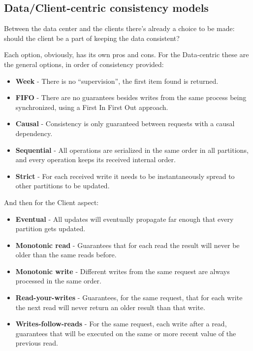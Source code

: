 \documentclass[14pt,oneside]{extreport}
\newcommand*\fpar{\hspace{1ex}}
\begin{document}
    \subsection{Data/Client-centric consistency models}
    \fpar Between the data center and the clients there's already a choice to be made: should the client be a part of keeping the data consistent?
    \par Each option, obviously, has its own pros and cons. For the Data-centric these are the general options, in order of consistency provided:
    \begin{itemize}[noitemsep]
      \item \textbf{Week} - There is no “supervision”, the first item found is returned.
      \item \textbf{FIFO} - There are no guarantees besides writes from the same process being synchronized, using a First In First Out approach.
      \item \textbf{Causal} - Consistency is only guaranteed between requests with a causal dependency.
      \item \textbf{Sequential} - All operations are serialized in the same order in all partitions, and every operation keeps its received internal order.
      \item \textbf{Strict} - For each received write it needs to be instantaneously spread to other partitions to be updated.
    \end{itemize}
    \par And then for the Client aspect:
    \begin{itemize}[noitemsep]
      \item \textbf{Eventual} - All updates will eventually propagate far enough that every partition gets updated.
      \item \textbf{Monotonic read} - Guarantees that for each read the result will never be older than the same reads before.
      \item \textbf{Monotonic write} - Different writes from the same request are always processed in the same order.
      \item \textbf{Read-your-writes} - Guarantees, for the same request, that for each write the next read will never return an older result than that write.
      \item \textbf{Writes-follow-reads} - For the same request, each write after a read, guarantees that will be executed on the same or more recent value of the previous read.
    \end{itemize}
\end{document}
